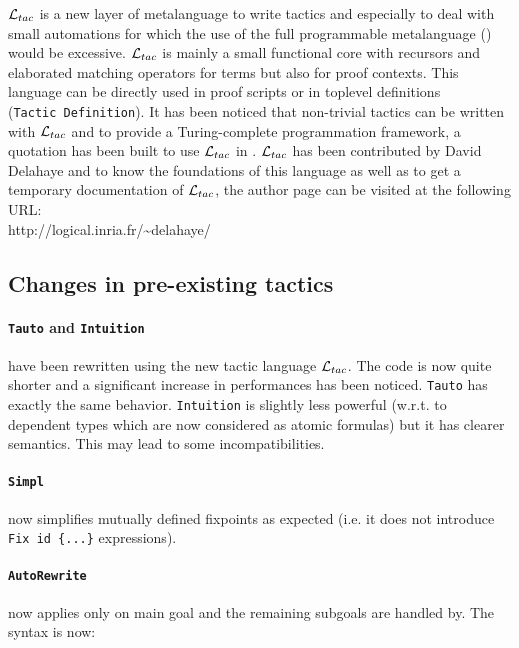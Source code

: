 \documentclass[11pt]{article}
\begin{document}
${\cal L}_{tac}$ is a new layer of metalanguage to write tactics and especially to deal
with small automations for which the use of the full programmable metalanguage
(\oc{}) would be excessive. ${\cal L}_{tac}$ is mainly a	small functional core with
recursors and elaborated matching operators for terms but also for proof
contexts. This language can be directly used in proof scripts or in toplevel
definitions ({\tt Tactic~Definition}). It has been noticed that non-trivial
tactics can be written with ${\cal L}_{tac}$ and to provide a Turing-complete
programmation framework, a quotation has been built to use ${\cal L}_{tac}$ in \oc{}.
${\cal L}_{tac}$ has been contributed by David Delahaye and to know the foundations of
this language as well as to get a temporary documentation of ${\cal L}_{tac}$, the
author page can be visited at the following URL:\\

http://logical.inria.fr/\~{}delahaye/

\subsection{Changes in pre-existing tactics}
\label{TacticChanges}

   \paragraph{{\tt Tauto} and {\tt Intuition}} have been rewritten using the
   new tactic language ${\cal L}_{tac}$. The code is now quite shorter and a significant
   increase in performances has been noticed. {\tt Tauto} has exactly the same
   behavior. {\tt Intuition} is slightly less powerful (w.r.t. to dependent
   types which are now considered as atomic formulas) but it has clearer
   semantics. This may lead to some incompatibilities.

  \paragraph{{\tt Simpl}} now simplifies mutually defined fixpoints
  as expected (i.e. it does not introduce {\tt Fix id
  \{...\}} expressions).

  \paragraph{{\tt AutoRewrite}} now applies only on main goal and the remaining
  subgoals are handled by. The syntax is now:\\
\end{document}
